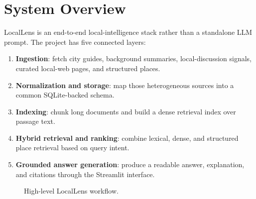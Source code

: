 \documentclass[11pt]{article}
\begin{document}
\section{System Overview}
LocalLens is an end-to-end local-intelligence stack rather than a standalone LLM prompt. The project has five connected layers:
\begin{enumerate}[leftmargin=*]
    \item \textbf{Ingestion}: fetch city guides, background summaries, local-discussion signals, curated local-web pages, and structured places.
    \item \textbf{Normalization and storage}: map those heterogeneous sources into a common SQLite-backed schema.
    \item \textbf{Indexing}: chunk long documents and build a dense retrieval index over passage text.
    \item \textbf{Hybrid retrieval and ranking}: combine lexical, dense, and structured place retrieval based on query intent.
    \item \textbf{Grounded answer generation}: produce a readable answer, explanation, and citations through the Streamlit interface.
\end{enumerate}

\begin{figure}[H]
\centering
{}
\caption{High-level LocalLens workflow.}
\label{fig:pipeline}
\end{figure}
\end{document}
